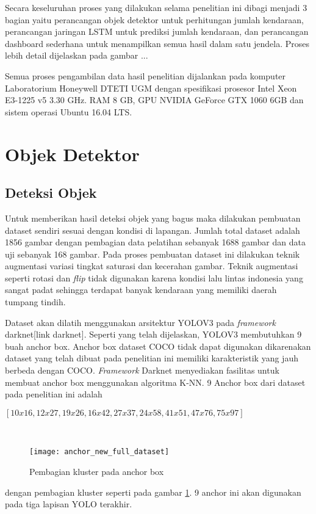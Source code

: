 \documentclass[../thesis.tex]{subfiles}
\begin{document}
Secara keseluruhan proses yang dilakukan selama penelitian ini dibagi menjadi 3 bagian yaitu perancangan objek detektor untuk perhitungan jumlah kendaraan,
perancangan jaringan LSTM untuk prediksi jumlah kendaraan, dan perancangan dashboard sederhana untuk menampilkan semua hasil dalam satu jendela.
Proses lebih detail dijelaskan pada gambar ...

Semua proses pengambilan data hasil penelitian dijalankan pada komputer Laboratorium Honeywell DTETI UGM dengan spesifikasi prosesor Intel Xeon E3-1225 v5 3.30 GHz.
RAM 8 GB, GPU NVIDIA GeForce GTX 1060 6GB dan sistem operasi Ubuntu 16.04 LTS.

\section{Objek Detektor}
\subsection{Deteksi Objek}
Untuk memberikan hasil deteksi objek yang bagus maka dilakukan pembuatan dataset sendiri sesuai dengan kondisi di lapangan. 
Jumlah total dataset adalah 1856 gambar dengan pembagian data pelatihan sebanyak 1688 gambar dan data uji sebanyak 168 gambar.
Pada proses pembuatan dataset ini dilakukan teknik augmentasi variasi tingkat saturasi dan kecerahan gambar. Teknik augmentasi seperti rotasi dan \textit{flip} tidak digunakan karena kondisi lalu lintas indonesia yang sangat padat sehingga 
terdapat banyak kendaraan yang memiliki daerah tumpang tindih.

Dataset akan dilatih menggunakan arsitektur YOLOV3 pada \textit{framework} darknet[link darknet]. Seperti yang telah dijelaskan, YOLOV3 membutuhkan 
9 buah anchor box. Anchor box dataset COCO tidak dapat digunakan dikarenakan dataset yang telah dibuat pada penelitian ini memiliki karakteristik yang jauh berbeda dengan COCO.
\textit{Framework} Darknet menyediakan fasilitas untuk membuat anchor box menggunakan algoritma K-NN. 9 Anchor box dari dataset pada penelitian ini adalah \\
\centerline{$[10x16, 12x27,  19x26,  16x42,  27x37,  24x58,  41x51, 47x76, 75x97]$}\

\begin{figure}[htp]
	\centering
	\texttt{[image: anchor\_new\_full\_dataset]}
	\caption{Pembagian kluster pada anchor box}
	\label{anchor_dataset}
\end{figure}
dengan pembagian kluster seperti pada gambar \ref{anchor_dataset}. 9 anchor ini akan digunakan pada tiga lapisan YOLO terakhir.
\end{document}

